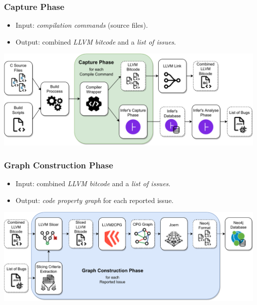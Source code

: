 \documentclass[10pt,xcolor=pdflatex,hyperref={unicode}]{beamer}
\begin{document}
\begin{frame}\frametitle{Capture Phase}
\doublespacing
    \begin{itemize}
        \item \alert{Input}: \emph{compilation commands} (source files).
        \item \alert{Output}: combined \emph{LLVM bitcode} and a \emph{list of issues}.
    \end{itemize}
    \vspace{0.8cm}
    \hspace{-0.77cm}
    \includegraphics[width=1.13\textwidth]{img/capture-modified.drawio.pdf}
\singlespacing
\end{frame}


\begin{frame}\frametitle{Graph Construction Phase}
\doublespacing

    \begin{itemize}
        \item \alert{Input}: combined \emph{LLVM bitcode} and a \emph{list of issues}.
        \item \alert{Output}: \emph{code property graph} for each reported issue.
    \end{itemize}
    \vspace{0.8cm}
    \hspace{-0.77cm}
    \includegraphics[width=1.13\textwidth]{img/construction-modified.drawio.pdf}
\singlespacing
\end{frame}
\end{document}
